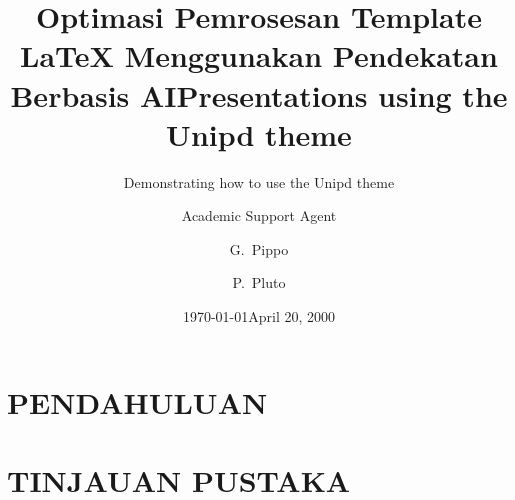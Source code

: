 \documentclass{beamer}
\title{Optimasi Pemrosesan Template LaTeX Menggunakan Pendekatan Berbasis AI}
\author{Academic Support Agent}
\date{\today}
\begin{document}
\maketitle

\begin{abstract}

\end{abstract}

\chapter{PENDAHULUAN}


\chapter{TINJAUAN PUSTAKA}



\usepackage[T1]{fontenc}
\usepackage[utf8]{inputenc}
\usepackage[english]{babel}
\usepackage{lmodern}


\title{Presentations using the Unipd theme}
\subtitle{Demonstrating how to use the Unipd theme}
\author[Pippo, Pluto]{G.~Pippo \and P.~Pluto}

\date{April 20, 2000}

\end{document}
